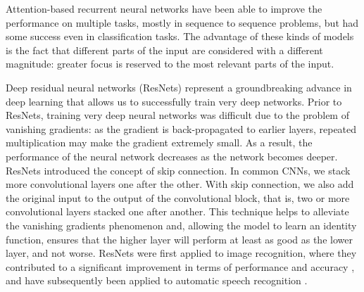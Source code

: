 Attention-based recurrent neural networks \cite{11,12} have been able to improve the performance on multiple tasks, mostly in sequence to sequence problems, but had some success even in classification tasks. The advantage of these kinds of models is the fact that different parts of the input are considered with a different magnitude: greater focus is reserved to the most relevant parts of the input.


Deep residual neural networks (ResNets) \cite{9} represent a groundbreaking advance in deep learning that allows us to successfully train very deep networks.
Prior to ResNets, training very deep neural networks was difficult due to the problem of vanishing gradients: as the gradient is back-propagated to earlier layers, repeated multiplication may make the gradient extremely small.
As a result, the performance of the neural network decreases as the network becomes deeper.
ResNets introduced the concept of skip connection.  In common CNNs, we stack more convolutional layers one after the other. With skip connection, we also add the original input to the output of the convolutional block, that is, two or more convolutional layers stacked one after another.
This technique helps to alleviate the vanishing gradients phenomenon and, allowing the model to learn an identity function, ensures that the higher layer will perform at least as good as the lower layer, and not worse.
ResNets were first applied to image recognition, where they contributed to a significant improvement in terms of performance and accuracy \cite{9}, and have subsequently been applied to automatic speech recognition \cite{13}.

